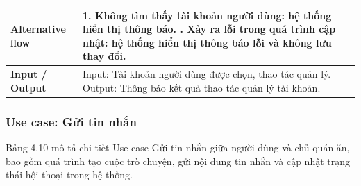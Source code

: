 \begin{longtable}{|p{4cm}|p{10cm}|}
\textbf{Alternative flow} &
1. Không tìm thấy tài khoản người dùng: hệ thống hiển thị thông báo. \newline 2. Xảy ra lỗi trong quá trình cập nhật: hệ thống hiển thị thông báo lỗi và không lưu thay đổi. \\
\hline

\textbf{Input / Output} &
Input: Tài khoản người dùng được chọn, thao tác quản lý. \newline Output: Thông báo kết quả thao tác quản lý tài khoản. \\
\hline

\end{longtable}
\endgroup


%
\subsubsection{Use case: Gửi tin nhắn}

Bảng 4.10 mô tả chi tiết Use case Gửi tin nhắn giữa người dùng
và chủ quán ăn, bao gồm quá trình tạo cuộc trò chuyện, gửi nội dung tin nhắn và cập nhật
trạng thái hội thoại trong hệ thống.

